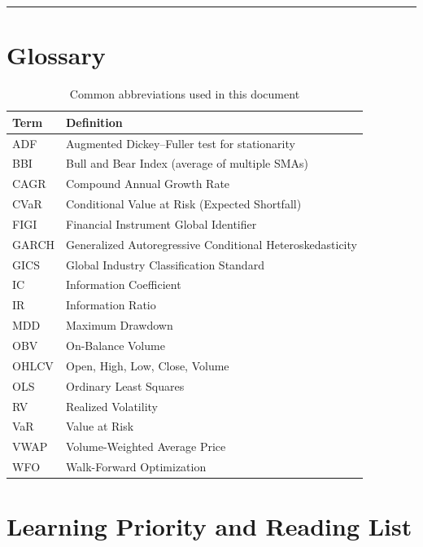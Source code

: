 \documentclass[a4paper, 11pt]{report}
\theoremstyle{definition}
\theoremstyle{remark}
\begin{document}
\bigskip\noindent\rule{\textwidth}{0.4pt}


\chapter{Glossary}
\label{app:glossary}

\begin{table}[ht]
\centering
\small
\begin{tabular}{@{}ll@{}}
\toprule
\textbf{Term} & \textbf{Definition} \\
\midrule
ADF       & Augmented Dickey--Fuller test for stationarity \\
BBI       & Bull and Bear Index (average of multiple SMAs) \\
CAGR      & Compound Annual Growth Rate \\
CVaR      & Conditional Value at Risk (Expected Shortfall) \\
FIGI      & Financial Instrument Global Identifier \\
GARCH     & Generalized Autoregressive Conditional Heteroskedasticity \\
GICS      & Global Industry Classification Standard \\
IC        & Information Coefficient \\
IR        & Information Ratio \\
MDD       & Maximum Drawdown \\
OBV       & On-Balance Volume \\
OHLCV     & Open, High, Low, Close, Volume \\
OLS       & Ordinary Least Squares \\
RV        & Realized Volatility \\
VaR       & Value at Risk \\
VWAP      & Volume-Weighted Average Price \\
WFO       & Walk-Forward Optimization \\
\bottomrule
\end{tabular}
\caption{Common abbreviations used in this document}
\end{table}


\chapter{Learning Priority and Reading List}
\label{app:priority}
\end{document}
